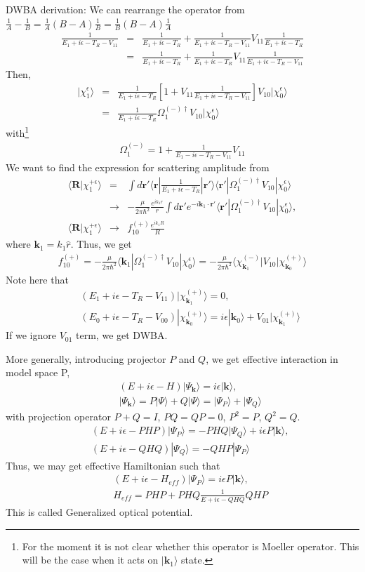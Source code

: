 \documentclass[11pt]{book}
\def\bm{\boldsymbol}
\def\vk{{\bm k}}
\def\vr{{\bm r}}
\def\vR{{\bm R}}
\def\la{\langle}
\def\ra{\rangle}
\newcommand{\bea}{\begin{eqnarray}}
\newcommand{\eea}{\end{eqnarray}}
\newcommand{\no}{\nonumber \\}
\begin{document}
DWBA derivation:
We can rearrange the operator from 
$\frac{1}{A}-\frac{1}{B}=\frac{1}{A}(B-A)\frac{1}{B}=\frac{1}{B}(B-A)\frac{1}{A}$
\bea 
\frac{1}{E_1+i\epsilon-T_R-V_{11}}
&=&\frac{1}{E_1+i\epsilon-T_R}+\frac{1}{E_1+i\epsilon-T_R-V_{11}}   V_{11}\frac{1}{E_1+i\epsilon-T_R} \no 
&=&\frac{1}{E_1+i\epsilon-T_R}+ \frac{1}{E_1+i\epsilon-T_R} V_{11}\frac{1}{E_1+i\epsilon-T_R-V_{11}} 
\eea 
Then, 
\bea 
|\chi_1^\epsilon\ra&=&\frac{1}{E_1+i\epsilon-T_R}\left[1+ 
   V_{11}\frac{1}{E_1+i\epsilon-T_R-V_{11}}\right]
   V_{10}|\chi_0^\epsilon\ra \no 
   &=&\frac{1}{E_1+i\epsilon-T_R}\Omega_{1}^{(-)\dagger} V_{10}|\chi_0^\epsilon\ra
\eea 
with\footnote{For the moment it is not clear whether this operator is Moeller operator.
This will be the case when it acts on $|\vk_1\ra $ state. 
} 
\bea 
\Omega_1^{(-)}=1+\frac{1}{E_1-i\epsilon-T_R-V_{11}}V_{11}
\eea 
We want to find the expression for scattering amplitude from
\bea 
\la \vR|\chi_1^{+\epsilon}\ra&=&\int d\vr' \la \vr|\frac{1}{E_1+i\epsilon-T_R}|\vr'\ra 
                                 \la \vr'|\Omega_{1}^{(-)\dagger} V_{10}|\chi_0^\epsilon\ra \no 
&\to& -\frac{\mu}{2\pi\hbar^2}\frac{e^{ik_1r}}{r}
      \int d\vr' e^{-i\vk_1\cdot\vr'}\la \vr'|\Omega_{1}^{(-)\dagger} V_{10}|\chi_0^\epsilon\ra,\no                                    
\la \vR|\chi_1^{+\epsilon}\ra&\to& f_{10}^{(+)}\frac{e^{ik_1R}}{R}                                
\eea 
where $\vk_1=k_1\hat{r}$. Thus, we get
\bea 
f_{10}^{(+)}=-\frac{\mu}{2\pi\hbar^2}\la \vk_1|\Omega_{1}^{(-)\dagger} V_{10}|\chi_0^\epsilon\ra
            =-\frac{\mu}{2\pi\hbar^2}\la \chi_{\vk_1}^{(-)}  | V_{10}|\chi_{\vk_0}^{(+)}\ra
\eea  
Note here that 
\bea 
& &(E_1+i\epsilon-T_R-V_{11})|\chi^{(+)}_{\vk_1}\ra=0 ,\no 
& &(E_0+i\epsilon-T_R-V_{00})|\chi^{(+)}_{\vk_0}\ra=i\epsilon|\vk_0\ra+V_{01}|\chi_{\vk_1}^{(+)}\ra    
\eea  
If we ignore $V_{01}$ term, we get DWBA. 

More generally, introducing projector $P$ and $Q$, we get effective interaction
in model space P,
\bea 
& &(E+i\epsilon -H)|\Psi_\vk\ra = i\epsilon|\vk\ra,\no   
& &|\Psi_{\vk}\ra=P|\Psi\ra +Q|\Psi\ra =|\Psi_P\ra +|\Psi_Q\ra 
\eea 
with projection operator $P+Q=I$, $PQ=QP=0$, $P^2=P$, $Q^2=Q$. 
\bea 
& &(E+i\epsilon -PHP)|\Psi_P\ra = -PHQ |\Psi_Q \ra+ i\epsilon P |\vk\ra, \no 
& &(E+i\epsilon -QHQ)|\Psi_Q\ra = -QHP |\Psi_P \ra
\eea 
Thus, we may get effective Hamiltonian such that 
\bea 
& &(E+i\epsilon -H_{eff})|\Psi_P\ra = i\epsilon P |\vk\ra,\no 
& &H_{eff}=PHP+PHQ\frac{1}{E+i\epsilon-QHQ}QHP 
\eea 
This is called Generalized optical potential.
\end{document}
